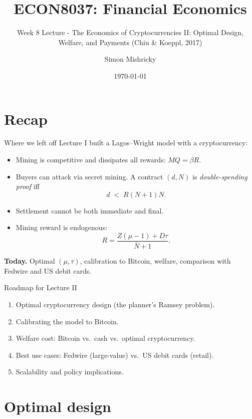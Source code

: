 \documentclass[aspectratio=169,xcolor=dvipsnames]{beamer}
\title{ECON8037: Financial Economics}
\subtitle{\normalsize Week 8 Lecture - The Economics of Cryptocurrencies II: Optimal Design, Welfare, and Payments (Chiu \& Koeppl, 2017)}
\author{Simon Mishricky}
\institute{Research School of Economics, Australian National University}
\date{\today}
\begin{document}
\section{Recap}
\frame{\titlepage}

\begin{frame}{Where we left off}
    Lecture I built a Lagos--Wright model with a cryptocurrency:
    \vspace{2mm}
    \begin{itemize}
        \item Mining is competitive and dissipates all rewards: $MQ = \beta R$.
        \item Buyers can attack via secret mining. A contract $(d,N)$ is
              \emph{double-spending proof} iff
              \[
                  d \;<\; R(N+1)N.
              \]
        \item Settlement cannot be both immediate and final.
        \item Mining reward is endogenous:
              \[
                  R = \frac{Z(\mu-1) + D\tau}{\bar N+1}.
              \]
    \end{itemize}
    \vspace{2mm}
    \textbf{Today.} Optimal $(\mu,\tau)$, calibration to Bitcoin, welfare, comparison with
    Fedwire and US debit cards.
\end{frame}

\begin{frame}{Roadmap for Lecture II}
    \begin{enumerate}
        \item Optimal cryptocurrency design (the planner's Ramsey problem).
        \item Calibrating the model to Bitcoin.
        \item Welfare cost: Bitcoin vs.\ cash vs.\ optimal cryptocurrency.
        \item Best use cases: Fedwire (large-value) vs.\ US debit cards (retail).
        \item Scalability and policy implications.
    \end{enumerate}
\end{frame}

\section{Optimal design}
\end{document}
